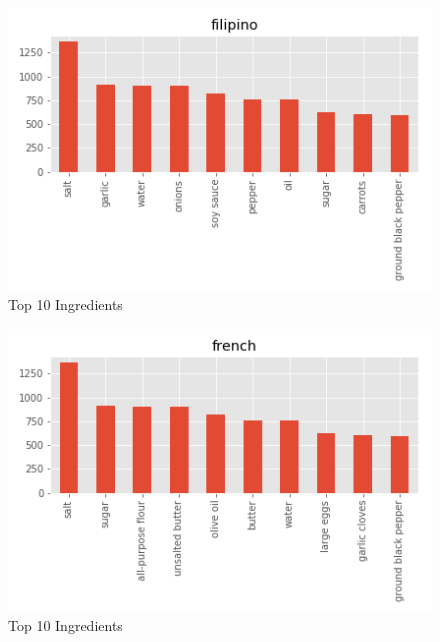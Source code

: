 \documentclass[sigconf]{acmart}
\begin{document}
\begin{figure}[!ht]
  \centering\includegraphics[width=\columnwidth]{images/filipino_10_most_used_ingredients.png}
  \caption{Top 10 Ingredients }\label{f:filipino_10_most_used_ingredients}
\end{figure}

\begin{figure}[!ht]
  \centering\includegraphics[width=\columnwidth]{images/french_10_most_used_ingredients.png}
  \caption{Top 10 Ingredients }\label{f:french_10_most_used_ingredients}
\end{figure}
\end{document}
